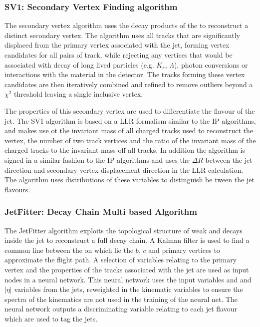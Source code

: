 	\subsubsection{SV1: Secondary Vertex Finding algorithm}
	\label{det:btag:sv}

		The secondary vertex algorithm uses the decay products of the \bhadron to reconstruct a distinct secondary vertex. The algorithm uses all tracks that are significantly displaced from the primary vertex associated with the jet, forming vertex candidates for all pairs of track, while rejecting any vertices that would be associated with decay of long lived particles (e.g. $K_s$, $\Lambda$), photon conversions or interactions with the material in the detector. The tracks forming these vertex candidates are then iteratively combined and refined to remove outliers beyond a $\chi^2$ threshold leaving a single inclusive vertex.

		The properties of this secondary vertex are used to differentiate the flavour of the jet. The SV1 algorithm is based on a LLR formalism similar to the IP algorithms, and makes use ot the invariant mass of all charged tracks used to reconstruct the vertex, the number of two track vertices and the ratio of the invariant mass of the charged tracks to the invariant mass off all tracks. In addition the algorithm is signed in a similar fashion to the IP algorithms and uses the $\Delta R$ between the jet direction and secondary vertex displacement direction in the LLR calculation. The algorithm uses distributions of these variables to distinguish be      tween the jet flavours. \cite{btagOptimisation, bTagPerformance} 

	\subsubsection{JetFitter: Decay Chain Multi based Algorithm}
	\label{det:btag:jf}

		The JetFitter algorithm exploits the topological structure of weak \bhadron and \chadron decays inside the jet to reconstruct a full \bhadron decay chain. A Kalman filter  is used to find a common line between the on which lie the $b$, $c$ and primary vertices to approximate the \bhadron flight path. A selection of variables relating to the primary vertex and the properties of the tracks associated with the jet are used as input nodes in a neural network. This neural network uses the input variables and \pt and $|\eta|$ variables from the jets, reweighted in the kinematic variables to ensure the spectra of the kinematics are not used in the training of the neural net. The neural network outputs a discriminating variable relating to each jet flavour which are used to tag the jets. \cite{btagIdentification}


